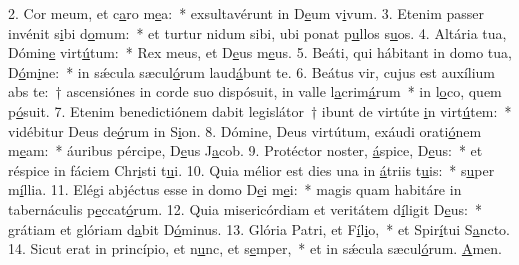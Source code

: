 2. Cor meum, et c\uline{a}ro m\uline{e}a:~* exsultavérunt in D\uline{e}um v\uline{i}vum.
3. Etenim passer invénit s\uline{i}bi d\uline{o}mum:~* et turtur nidum sibi, ubi ponat p\uline{u}llos s\uline{u}os.
4. Altária tua, Dómin\uline{e} virt\uline{ú}tum:~* Rex meus, et D\uline{e}us m\uline{e}us.
5. Beáti, qui hábitant in domo tua, D\uline{ó}m\uline{i}ne:~* in sǽcula sæcul\uline{ó}rum laud\uline{á}bunt te.
6. Beátus vir, cujus est auxílium abs te:~† ascensiónes in corde suo dispósuit, in valle l\uline{a}crim\uline{á}rum~* in l\uline{o}co, quem p\uline{ó}suit.
7. Etenim benedictiónem dabit legislátor~† ibunt de virtúte \uline{i}n virt\uline{ú}tem:~* vidébitur Deus de\uline{ó}rum in S\uline{i}on.
8. Dómine, Deus virtútum, exáudi orati\uline{ó}nem m\uline{e}am:~* áuribus pércipe, D\uline{e}us J\uline{a}cob.
9. Protéctor noster, \uline{á}spice, D\uline{e}us:~* et réspice in fáciem Chr\uline{i}sti t\uline{u}i.
10. Quia mélior est dies una in \uline{á}triis t\uline{u}is:~* s\uline{u}per m\uline{í}llia.
11. Elégi abjéctus esse in domo D\uline{e}i m\uline{e}i:~* magis quam habitáre in tabernáculis p\uline{e}ccat\uline{ó}rum.
12. Quia misericórdiam et veritátem d\uline{í}ligit D\uline{e}us:~* grátiam et glóriam d\uline{a}bit D\uline{ó}minus.
13. Glória Patri, et F\uline{í}l\uline{i}o,~* et Spir\uline{í}tui S\uline{a}ncto.
14. Sicut erat in princípio, et n\uline{u}nc, et s\uline{e}mper,~* et in sǽcula sæcul\uline{ó}rum. \uline{A}men.
